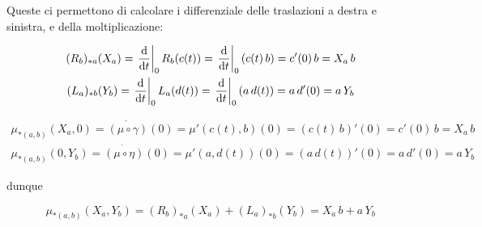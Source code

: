 {Queste ci permettono di calcolare i differenziale delle traslazioni a destra e sinistra, e della moltiplicazione:

\begin{gather}
	(R_{b})_{*a}(X_{a}) = \eval{ \dv{t} }_{0} R_{b}(c(t)) %
	= \eval{ \dv{t} }_{0} (c(t) \, b) %
	= c'(0) \, b %
	= X_{a} \, b \\
	(L_{a})_{*b}(Y_{b}) = \eval{ \dv{t} }_{0} L_{a}(d(t)) %
	= \eval{ \dv{t} }_{0} (a \, d(t)) %
	= a \, d'(0) %
	= a \, Y_{b}
\end{gather}

\begin{gather}
	\mu_{*(a,b)}(X_{a}, 0) = \dot{ (\mu \circ \gamma) }(0) %
	= \mu'(c(t), b)(0) %
	= (c(t) \, b)'(0) %
	= c'(0) \, b %
	= X_{a} \, b \\
	\mu_{*(a,b)}(0, Y_{b}) = \dot{ (\mu \circ \eta) }(0) %
	= \mu'(a, d(t))(0) %
	= (a \, d(t))'(0) %
	= a \, d'(0) %
	= a \, Y_{b}
\end{gather}

dunque

\begin{equation}
	\mu_{*(a,b)}(X_{a},Y_{b}) = (R_{b})_{*a}(X_{a}) + (L_{a})_{*b}(Y_{b}) %
	= X_{a} \, b + a \, Y_{b}
\end{equation}
}


